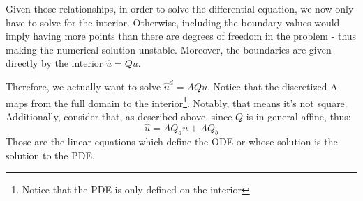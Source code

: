 \documentclass[11pt]{article}
\begin{document}
\begin{itemize}
		
			Given those relationships, in order to solve the differential equation, we now only have to solve for the interior. Otherwise, including the boundary values would imply having more points than there are degrees of freedom in the problem - thus making the numerical solution unstable. Moreover, the boundaries are given directly by the interior $\hat{u} = Qu$. 
		
			Therefore, we actually want to solve $\hat{u}^d = AQu$. Notice that the discretized A maps from the full domain to the interior\footnote{Notice that the PDE is only defined on the interior}. Notably, that means it's not square. Additionally, consider that, as described above, since $Q$ is in general affine, thus:
			\begin{equation}
			\hat{u} = AQ_au + AQ_b
			\end{equation}
			Those are the linear equations which define the ODE or whose solution is the solution to the PDE.
		\end{itemize}	
	
\end{document}
